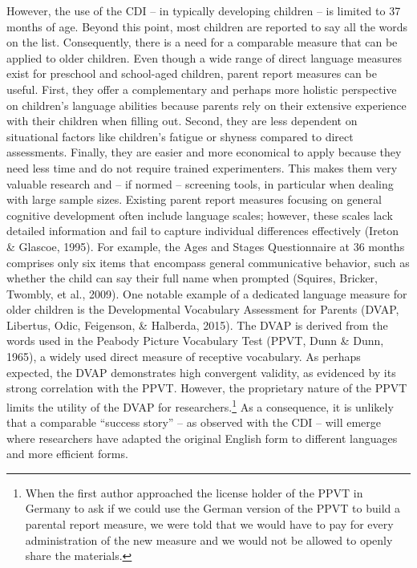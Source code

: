 \documentclass[
  man,floatsintext]{apa6}
\begin{document}
However, the use of the CDI -- in typically developing children -- is limited to 37 months of age. Beyond this point, most children are reported to say all the words on the list. Consequently, there is a need for a comparable measure that can be applied to older children. Even though a wide range of direct language measures exist for preschool and school-aged children, parent report measures can be useful. First, they offer a complementary and perhaps more holistic perspective on children's language abilities because parents rely on their extensive experience with their children when filling out. Second, they are less dependent on situational factors like children's fatigue or shyness compared to direct assessments. Finally, they are easier and more economical to apply because they need less time and do not require trained experimenters. This makes them very valuable research and -- if normed -- screening tools, in particular when dealing with large sample sizes. Existing parent report measures focusing on general cognitive development often include language scales; however, these scales lack detailed information and fail to capture individual differences effectively (Ireton \& Glascoe, 1995). For example, the Ages and Stages Questionnaire at 36 months comprises only six items that encompass general communicative behavior, such as whether the child can say their full name when prompted (Squires, Bricker, Twombly, et al., 2009). One notable example of a dedicated language measure for older children is the Developmental Vocabulary Assessment for Parents (DVAP, Libertus, Odic, Feigenson, \& Halberda, 2015). The DVAP is derived from the words used in the Peabody Picture Vocabulary Test (PPVT, Dunn \& Dunn, 1965), a widely used direct measure of receptive vocabulary. As perhaps expected, the DVAP demonstrates high convergent validity, as evidenced by its strong correlation with the PPVT. However, the proprietary nature of the PPVT limits the utility of the DVAP for researchers.\footnote{When the first author approached the license holder of the PPVT in Germany to ask if we could use the German version of the PPVT to build a parental report measure, we were told that we would have to pay for every administration of the new measure and we would not be allowed to openly share the materials.} As a consequence, it is unlikely that a comparable ``success story'' -- as observed with the CDI -- will emerge where researchers have adapted the original English form to different languages and more efficient forms.
\end{document}

